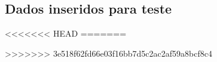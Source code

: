 \documentclass[
	12pt,				%
	openright,			%
	oneside,			%
	a4paper,			%
	chapter=TITLE,		%
	section=TITLE,		%
	english,			%
	brazil				%
	]{abntex2}
\begin{document}





\begin{anexosenv}

\partanexos

\chapter{Dados inseridos para teste}



\end{anexosenv}


\printindex

<<<<<<< HEAD
=======
%

>>>>>>> 3e518f62fd66e03f16bb7d5c2ac2af59a8bcf8c4
\end{document}
